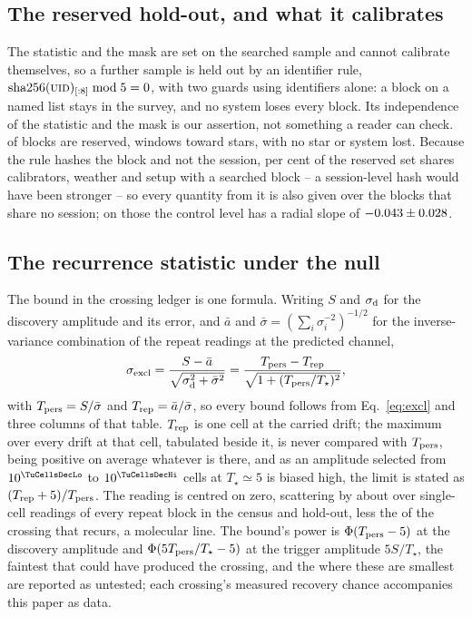 \subsection{The reserved hold-out, and what it calibrates}
\label{sec:heldout}

The statistic and the mask are set on the searched sample and cannot
calibrate themselves, so a further sample is held out by an identifier rule,
$\mathrm{sha256}(\textsc{uid})_{[:8]} \bmod 5 = 0$, with two guards using
identifiers alone: a block on a named list stays in the survey, and no system
loses every block. Its independence of the statistic and the mask is our
assertion, not something a reader can check. \NEbHeldOut{} of
\NEbProcessedAll{} blocks are reserved, \HoWin{} windows toward \HoStars{}
stars, with no star or system lost. Because the rule hashes the block and not
the session, \HsSharePct{} per cent of the reserved set shares calibrators,
weather and setup with a searched block -- a session-level hash would have
been stronger -- so every quantity from it is also given over the
\HsIndBlocks{} blocks that share no session; on those the control level has a
radial slope of $-0.043\pm0.028$.

\subsection{The recurrence statistic under the null}
\label{sec:nullscatter}

The bound in the crossing ledger is one formula. Writing $S$ and
$\sigma_{\rm d}$ for the discovery amplitude and its error, and $\bar{a}$ and
$\bar{\sigma}=(\sum_i\sigma_i^{-2})^{-1/2}$ for the inverse-variance
combination of the repeat readings at the predicted channel,
\begin{equation}
\sigma_{\rm excl}=\frac{S-\bar{a}}
{\sqrt{\sigma_{\rm d}^{2}+\bar{\sigma}^{2}}}
=\frac{T_{\rm pers}-T_{\rm rep}}{\sqrt{1+(T_{\rm pers}/T_\star)^{2}}},
\label{eq:excl}
\end{equation}
with $T_{\rm pers}=S/\bar{\sigma}$ and $T_{\rm rep}=\bar{a}/\bar{\sigma}$, so
every bound follows from Eq.~\ref{eq:excl} and three columns of that table.
$T_{\rm rep}$ is one cell at the carried drift; the maximum over every drift
at that cell, tabulated beside it, is never compared with $T_{\rm pers}$,
being positive on average whatever is there, and as an amplitude selected
from $10^{\TuCellsDecLo}$ to $10^{\TuCellsDecHi}$ cells at $T_\star\simeq5$ is
biased high, the limit is stated as $(T_{\rm rep}+5)/T_{\rm pers}$. The reading
is centred on zero, scattering by \NuNullSd{} about \NuNullMean{} over
\NuNullN{} single-cell readings of every repeat block in the census and
hold-out, less the \NuNullNRecExcl{} of the crossing that recurs, a molecular line. The bound's power is $\Phi(T_{\rm pers}-5)$ at the discovery
amplitude and $\Phi(5T_{\rm pers}/T_\star-5)$ at the trigger amplitude
$5S/T_\star$, the faintest that could have produced the crossing, and the
\HjNPowerLo{} where these are smallest are reported as untested; each
crossing's measured recovery chance accompanies this paper as data.


